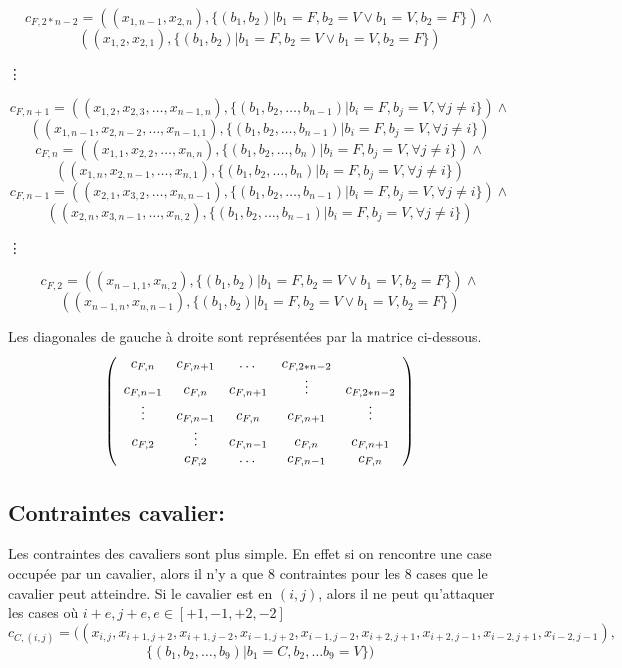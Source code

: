 \documentclass[a4paper,10pt]{article}
\begin{document}
$$ c_{F,2*n-2} = ((x_{1,n-1}, x_{2,n}), \{(b_1, b_2)| b_1 = F, b_2 = V \lor b_1 = V, b_2 = F\})\land$$ $$((x_{1,2}, x_{2,1}), \{(b_1, b_2)| b_1 = F, b_2 = V \lor b_1 = V, b_2 = F\}) $$ 
{\centering
  \vdots\par
}
$$ c_{F,n+1} = ((x_{1,2}, x_{2,3}, \ldots, x_{n-1,n}), \{(b_1, b_2, \ldots, b_{n-1})|b_i = F, b_j = V, \forall j \ne i\}) \land$$ $$((x_{1,n-1},x_{2,n-2}, \ldots, x_{n-1,1}), \{(b_1, b_2, \ldots, b_{n-1})|b_i = F, b_j = V, \forall j \ne i\}) $$
$$ c_{F,n} = ((x_{1,1}, x_{2,2},\ldots, x_{n,n}), \{(b_1, b_2, \ldots, b_n)|b_i = F, b_j = V, \forall j \ne i\}) \land$$ $$((x_{1,n}, x_{2,n-1}, \ldots, x_{n, 1}), \{(b_1, b_2, \ldots, b_n)|b_i = F, b_j = V, \forall j \ne i\})$$
$$ c_{F,n-1} = ((x_{2,1}, x_{3,2},\ldots, x_{n, n-1}), \{(b_1, b_2, \ldots, b_{n-1})|b_i = F, b_j = V, \forall j \ne i\}) \land$$ $$((x_{2,n}, x_{3,n-1}, \ldots, x_{n,2}), \{(b_1, b_2, \ldots, b_{n-1})|b_i = F, b_j = V, \forall j \ne i\}) $$
{\centering
  \vdots\par
}
$$ c_{F,2} = ((x_{n-1,1}, x_{n,2}), \{(b_1, b_2)| b_1 = F, b_2 = V \lor b_1 = V, b_2 = F\}) \land$$ $$((x_{n-1,n}, x_{n,n-1}), \{(b_1, b_2)|b_1 = F, b_2 = V \lor b_1 = V, b_2 = F\}) $$

	Les diagonales de gauche à droite sont représentées par la matrice ci-dessous.
\begin{equation}
\left( \begin{array}{ccccc}
c_{F,n} & c_{F,n+1} & \dots & c_{F,2*n-2} & \hfill \\
c_{F,n-1} & c_{F,n} & c_{F,n+1} & \vdots&  c_{F,2*n-2}\\
\vdots & c_{F,n-1} & c_{F,n} &c_{F,n+1} & \vdots \\
c_{F,2}& \vdots & c_{F,n-1}& c_{F,n} &c_{F,n+1} \\
\hfill & c_{F,2} & \dots& c_{F,n-1} & c_{F,n} \\
\end{array} \right)
\end{equation}

\subsection{Contraintes cavalier:}
	Les contraintes des cavaliers sont plus simple. En effet si on rencontre une case occupée par un cavalier, alors il n'y a que 8 contraintes pour les 8 cases que le cavalier peut atteindre. Si le cavalier est en $(i,j)$, alors il ne peut qu'attaquer les cases où $i+e,j+e, e \in [+1,-1,+2,-2]$
$$ c_{C,(i,j)} = ((x_{i,j}, x_{i+1,j+2}, x_{i+1,j-2}, x_{i-1,j+2}, x_{i-1,j-2}, x_{i+2,j+1}, x_{i+2,j-1}, x_{i-2,j+1}, x_{i-2,j-1}),$$ $$\{(b_1, b_2, \ldots, b_9)|b_1 = C, b_2, \ldots b_9 = V\}) $$
\end{document}

